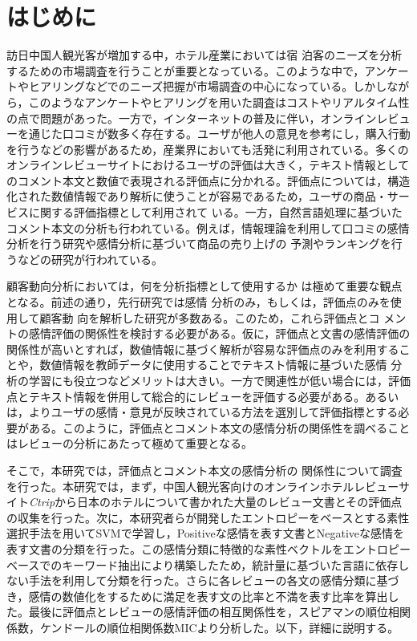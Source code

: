 \documentclass[review]{elsarticle}
\begin{document}
\begin{CJK}{UTF8}{min}
\begin{frontmatter}
\begin{keyword}
\end{keyword}

\end{frontmatter}

\section{はじめに}\label{intro}

訪日中国人観光客が増加する中，ホテル産業においては宿 泊客のニーズを分析するための市場調査を行うことが重要となっている。このような中で，アンケートやヒアリングなどでのニーズ把握が市場調査の中心になっている。しかしながら，このようなアンケートやヒアリングを用いた調査はコストやリアルタイム性の点で問題があった。一方で，インターネットの普及に伴い，オンラインレビューを通じた口コミが数多く存在する。ユーザが他人の意見を参考にし，購入行動を行うなどの影響がある\cite[][]{VERMEULEN2009123, SPARKS20111310}ため，産業界においても活発に利用されている。多くのオンラインレビューサイトにおけるユーザの評価は大きく，テキスト情報としてのコメント本文と数値で表現される評価点に分かれる。評価点については，構造化された数値情報であり解析に使うことが容易であるため，ユーザの商品・サービスに関する評価指標として利用されて いる\cite[][]{XIE20141, BULCHANDGIDUMAL201344, ZHOU20141}。一方，自然言語処理に基づいたコメント本文の分析も行われている。例えば，情報理論を利用して口コミの感情分析を行う研究\cite[][]{AMPLAYO201754}や感情分析に基づいて商品の売り上げの 予測\cite[][]{FAN201790}やランキング\cite[][]{LIU2017149}を行うなどの研究が行われている。

顧客動向分析においては，何を分析指標として使用するか は極めて重要な観点となる。前述の通り，先行研究では感情 分析のみ\cite[][]{AMPLAYO201754,LIU2017149}，もしくは，評価点のみ\cite[][]{XIE20141, BULCHANDGIDUMAL201344, ZHOU20141}を使用して顧客動 向を解析した研究が多数ある。このため，これら評価点とコ メントの感情評価の関係性を検討する必要がある。仮に，評価点と文書の感情評価の関係性が高いとすれば，数値情報に基づく解析が容易な評価点のみを利用することや，数値情報を教師データに使用することでテキスト情報に基づいた感情 分析の学習にも役立つなどメリットは大きい。一方で関連性が低い場合には，評価点とテキスト情報を併用して総合的にレビューを評価する必要がある。あるいは，よりユーザの感情・意見が反映されている方法を選別して評価指標とする必要がある。このように，評価点とコメント本文の感情分析の関係性を調べることはレビューの分析にあたって極めて重要となる。

そこで，本研究では，評価点とコメント本文の感情分析の 関係性について調査を行った。本研究では，まず，中国人観光客向けのオンラインホテルレビューサイト\textit{Ctrip}から日本のホテルについて書かれた大量のレビュー文書とその評価点の収集を行った。次に，本研究者らが開発したエントロピーをベースとする素性選択手法を用いてSVMで学習し，Positiveな感情を表す文書とNegativeな感情を表す文書の分類を行った。この感情分類に特徴的な素性ベクトルをエントロピーベースでのキーワード抽出により構築したため，統計量に基づいた言語に依存しない手法を利用して分類を行った。さらに各レビューの各文の感情分類に基づき，感情の数値化をするために満足を表す文の比率と不満を表す比率を算出した。最後に評価点とレビューの感情評価の相互関係性を，スピアマンの順位相関係数，ケンドールの順位相関係数MICより分析した。以下，詳細に説明する。



\end{CJK}
\end{document}
